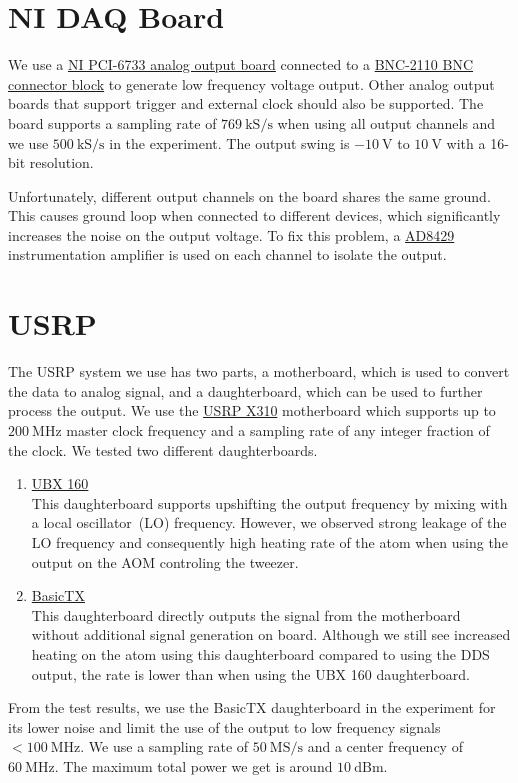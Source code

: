 \section{NI DAQ Board}
\label{appendex:computer-control:nidaq}

We use a \href{https://www.ni.com/en-us/support/model.pci-6733.html}
{NI PCI-6733 analog output board} connected to a
\href{https://www.ni.com/en-us/support/model.bnc-2110.html}{BNC-2110 BNC connector block}
to generate low frequency voltage output.
Other analog output boards that support trigger and external clock should also be supported.
The board supports a sampling rate of $769~\mathrm{kS/s}$ when using all output channels
and we use $500~\mathrm{kS/s}$ in the experiment.
The output swing is $-10~\mathrm{V}$ to $10~\mathrm{V}$ with a 16-bit resolution.

Unfortunately, different output channels on the board shares the same ground.
This causes ground loop when connected to different devices,
which significantly increases the noise on the output voltage.
To fix this problem, a \href{https://www.analog.com/en/products/ad8429.html}{AD8429}
instrumentation amplifier is used on each channel to isolate the output.

\section{USRP}
\label{appendex:computer-control:usrp}

The USRP system we use has two parts,
a motherboard, which is used to convert the data to analog signal,
and a daughterboard, which can be used to further process the output.
We use the \href{https://www.ettus.com/all-products/x310-kit/}{USRP X310}
motherboard which supports up to $200~\mathrm{MHz}$ master clock frequency
and a sampling rate of any integer fraction of the clock.
We tested two different daughterboards.
\begin{enumerate}
\item \href{https://www.ettus.com/all-products/ubx160/}{UBX 160}\\
  This daughterboard supports upshifting the output frequency
  by mixing with a local oscillator~(LO) frequency.
  However, we observed strong leakage of the LO frequency
  and consequently high heating rate of the atom
  when using the output on the AOM controling the tweezer.
\item \href{https://www.ettus.com/all-products/basictx/}{BasicTX}\\
  This daughterboard directly outputs the signal from the motherboard
  without additional signal generation on board.
  Although we still see increased heating on the atom using this daughterboard
  compared to using the DDS output,
  the rate is lower than when using the UBX 160 daughterboard.
\end{enumerate}
From the test results, we use the BasicTX daughterboard in the experiment
for its lower noise and limit the use of the output
to low frequency signals $<\!100~\mathrm{MHz}$.
We use a sampling rate of $50~\mathrm{MS/s}$ and a center frequency of $60~\mathrm{MHz}$.
The maximum total power we get is around $10~\mathrm{dBm}$.
